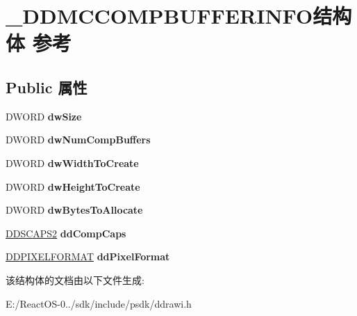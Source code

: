 \hypertarget{struct___d_d_m_c_c_o_m_p_b_u_f_f_e_r_i_n_f_o}{}\section{\+\_\+\+D\+D\+M\+C\+C\+O\+M\+P\+B\+U\+F\+F\+E\+R\+I\+N\+F\+O结构体 参考}
\label{struct___d_d_m_c_c_o_m_p_b_u_f_f_e_r_i_n_f_o}
\subsection*{Public 属性}
\begin{DoxyCompactItemize}
\item 
\mbox{\label{struct___d_d_m_c_c_o_m_p_b_u_f_f_e_r_i_n_f_o_a8f30f8051d407ae30c94541546ec689b}} 
D\+W\+O\+RD {\bfseries dw\+Size}
\item 
\mbox{\label{struct___d_d_m_c_c_o_m_p_b_u_f_f_e_r_i_n_f_o_a244346170dd852a2678e6ee6d3442d87}} 
D\+W\+O\+RD {\bfseries dw\+Num\+Comp\+Buffers}
\item 
\mbox{\label{struct___d_d_m_c_c_o_m_p_b_u_f_f_e_r_i_n_f_o_af576cdb1e27bb1bea38be6edb3854c33}} 
D\+W\+O\+RD {\bfseries dw\+Width\+To\+Create}
\item 
\mbox{\label{struct___d_d_m_c_c_o_m_p_b_u_f_f_e_r_i_n_f_o_acfd5ab2e629a069505567c5e3e72649a}} 
D\+W\+O\+RD {\bfseries dw\+Height\+To\+Create}
\item 
\mbox{\label{struct___d_d_m_c_c_o_m_p_b_u_f_f_e_r_i_n_f_o_a1e6c7bc8e9eaed4cec16dde85414ea1c}} 
D\+W\+O\+RD {\bfseries dw\+Bytes\+To\+Allocate}
\item 
\mbox{\label{struct___d_d_m_c_c_o_m_p_b_u_f_f_e_r_i_n_f_o_a0af3f3d9b6a4beb80e48bf0129432664}} 
\hyperlink{struct___d_d_s_c_a_p_s2}{D\+D\+S\+C\+A\+P\+S2} {\bfseries dd\+Comp\+Caps}
\item 
\mbox{\label{struct___d_d_m_c_c_o_m_p_b_u_f_f_e_r_i_n_f_o_a153b6f929e6e1b276cb1a363cc951c9e}} 
\hyperlink{struct___d_d_p_i_x_e_l_f_o_r_m_a_t}{D\+D\+P\+I\+X\+E\+L\+F\+O\+R\+M\+AT} {\bfseries dd\+Pixel\+Format}
\end{DoxyCompactItemize}


该结构体的文档由以下文件生成\+:\begin{DoxyCompactItemize}
\item 
E\+:/\+React\+O\+S-\/0../sdk/include/psdk/ddrawi.\+h\end{DoxyCompactItemize}
